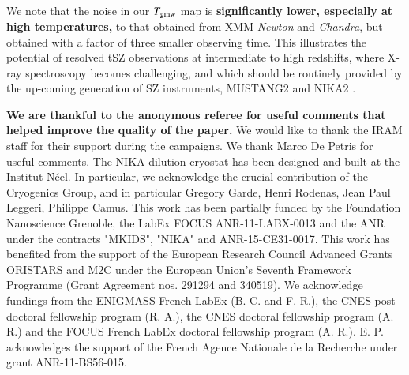 \documentclass[twocolumn,traditabstract]{aa}
\begin{document}
We note that the noise in our $T_{\rm gmw}$ map is {\bf significantly lower, especially at high temperatures,} to that obtained from XMM-\textit{Newton} and \textit{Chandra}, but obtained with a factor of three smaller observing time. This illustrates the potential of resolved tSZ observations at intermediate to high redshifts, where X-ray spectroscopy becomes challenging, and which should be routinely provided by the up-coming generation of SZ instruments, MUSTANG2 \citep{Dicker2014} and NIKA2 \citep{Calvo2016,Comis2016}.

\begin{acknowledgements}
{\bf We are thankful to the anonymous referee for useful comments that helped improve the quality of the paper.}
We would like to thank the IRAM staff for their support during the campaigns. 
We thank Marco De Petris for useful comments.
The NIKA dilution cryostat has been designed and built at the Institut N\'eel. In particular, we acknowledge the crucial contribution of the Cryogenics Group, and  in particular Gregory Garde, Henri Rodenas, Jean Paul Leggeri, Philippe Camus. 
This work has been partially funded by the Foundation Nanoscience Grenoble, the LabEx FOCUS ANR-11-LABX-0013 and the ANR under the contracts "MKIDS", "NIKA" and ANR-15-CE31-0017. 
This work has benefited from the support of the European Research Council Advanced Grants ORISTARS and M2C under the European Union's Seventh Framework Programme (Grant Agreement nos. 291294 and 340519).
We acknowledge fundings from the ENIGMASS French LabEx (B. C. and F. R.), the CNES post-doctoral fellowship program (R. A.),  the CNES doctoral fellowship program (A. R.) and the FOCUS French LabEx doctoral fellowship program (A. R.).
E. P. acknowledges the support of the French Agence Nationale de la Recherche under grant ANR-11-BS56-015.
\end{acknowledgements}


\end{document}
